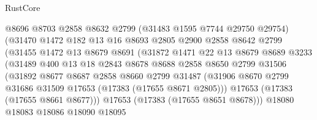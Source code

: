 \begin{lexlean}{RustCore}
\begin{coremodule}
                            @8696
                            @8703
                            @2858
                            @8632
                            @2799
                            (@31483 @1595 @7744 @29750 @29754)
                            (@31470
                              @1472
                              @182
                              @13
                              @16
                              @8693
                              @2805
                              @2900
                              @2858
                              @8642
                              @2799
                              (@31455
                                @1472
                                @13
                                @8679
                                @8691
                                (@31872
                                  @1471
                                  @22
                                  @13
                                  @8679
                                  @8689
                                  @3233
                                  (@31489
                                    @400
                                    @13
                                    @18
                                    @2843
                                    @8678
                                    @8688
                                    @2858
                                    @8650
                                    @2799
                                    @31506
                                    (@31892
                                      @8677
                                      @8687
                                      @2858
                                      @8660
                                      @2799
                                      @31487
                                      (@31906
                                        @8670
                                        @2799
                                        @31686
                                        @31509
                                        @17653
                                        (@17383 (@17655 @8671 @2805)))
                                      @17653
                                      (@17383 (@17655 @8661 @8677)))
                                    @17653
                                    (@17383 (@17655 @8651 @8678)))
                                  @18080
                                  @18083
                                  @18086
                                  @18090
                                  @18095

\end{coremodule}
\end{lexlean}
